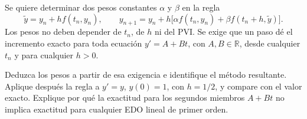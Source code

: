 Se quiere determinar dos pesos constantes \(\alpha\) y \(\beta\) en la regla
\[
\widetilde y=y_n+h f(t_n,y_n),\qquad
 y_{n+1}=y_n+h\big[\alpha f(t_n,y_n)+\beta f(t_n+h,\widetilde y)\big].
\]
Los pesos no deben depender de \(t_n\), de \(h\) ni del PVI. Se exige que un paso dé el incremento exacto para toda ecuación \(y'=A+Bt\), con \(A,B\in\mathbb R\), desde cualquier \(t_n\) y para cualquier \(h>0\).

Deduzca los pesos a partir de esa exigencia e identifique el método resultante. Aplique después la regla a \(y'=y\), \(y(0)=1\), con \(h=1/2\), y compare con el valor exacto. Explique por qué la exactitud para los segundos miembros \(A+Bt\) no implica exactitud para cualquier EDO lineal de primer orden.
